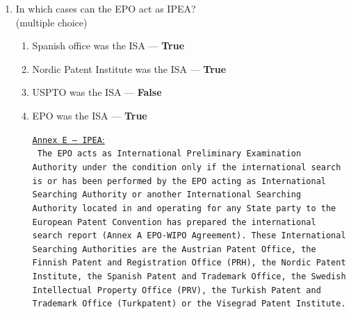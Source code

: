 \documentclass{report}
\begin{document}
\begin{enumerate}[label=\textbf{Answer \arabic*}]
    \item %
    In which cases can the EPO act as IPEA? \\
    (multiple choice)
    
    \begin{enumerate}[label=(\alph*)]
        \item Spanish office was the ISA --- \textbf{True}
        \item Nordic Patent Institute was the ISA --- \textbf{True}
        \item USPTO was the ISA --- \textbf{False}
        \item EPO was the ISA --- \textbf{True}
        
        \underline{\texttt{Annex E -- IPEA}:} \\
        \texttt{
The EPO acts as International Preliminary Examination Authority under the condition only if the international search is or has been performed by the EPO acting as International Searching Authority or another International Searching Authority located in and operating for any State party to the European Patent Convention has prepared the international search report (Annex A EPO-WIPO Agreement). These International Searching Authorities are the Austrian Patent Office, the Finnish Patent and Registration Office (PRH), the Nordic Patent Institute, the Spanish Patent and Trademark Office, the Swedish Intellectual Property Office (PRV), the Turkish Patent and Trademark Office (Turkpatent) or the Visegrad Patent Institute.}
    \end{enumerate}


\end{enumerate}
\end{document}
